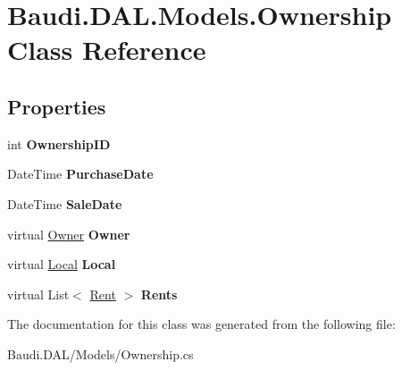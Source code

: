 \hypertarget{class_baudi_1_1_d_a_l_1_1_models_1_1_ownership}{}\section{Baudi.\+D\+A\+L.\+Models.\+Ownership Class Reference}
\label{class_baudi_1_1_d_a_l_1_1_models_1_1_ownership}
\subsection*{Properties}
\begin{DoxyCompactItemize}
\item 
\hypertarget{class_baudi_1_1_d_a_l_1_1_models_1_1_ownership_a67588bd63f0962b2f5cf62d6778af4b2}{}int {\bfseries Ownership\+I\+D}\label{class_baudi_1_1_d_a_l_1_1_models_1_1_ownership_a67588bd63f0962b2f5cf62d6778af4b2}

\item 
\hypertarget{class_baudi_1_1_d_a_l_1_1_models_1_1_ownership_abc943dc262607f0913859eef37ecb607}{}Date\+Time {\bfseries Purchase\+Date}\label{class_baudi_1_1_d_a_l_1_1_models_1_1_ownership_abc943dc262607f0913859eef37ecb607}

\item 
\hypertarget{class_baudi_1_1_d_a_l_1_1_models_1_1_ownership_aa1959d9d10b0accbbd3972854c8a0af5}{}Date\+Time {\bfseries Sale\+Date}\label{class_baudi_1_1_d_a_l_1_1_models_1_1_ownership_aa1959d9d10b0accbbd3972854c8a0af5}

\item 
\hypertarget{class_baudi_1_1_d_a_l_1_1_models_1_1_ownership_a6d30055ea92b03795b75364697a832e9}{}virtual \hyperlink{class_baudi_1_1_d_a_l_1_1_models_1_1_owner}{Owner} {\bfseries Owner}\label{class_baudi_1_1_d_a_l_1_1_models_1_1_ownership_a6d30055ea92b03795b75364697a832e9}

\item 
\hypertarget{class_baudi_1_1_d_a_l_1_1_models_1_1_ownership_a1c18e57fd0fec27084495006e2eb7e2e}{}virtual \hyperlink{class_baudi_1_1_d_a_l_1_1_models_1_1_local}{Local} {\bfseries Local}\label{class_baudi_1_1_d_a_l_1_1_models_1_1_ownership_a1c18e57fd0fec27084495006e2eb7e2e}

\item 
\hypertarget{class_baudi_1_1_d_a_l_1_1_models_1_1_ownership_ac3b4c10ba07ddb6c75355ad64cf60979}{}virtual List$<$ \hyperlink{class_baudi_1_1_d_a_l_1_1_models_1_1_rent}{Rent} $>$ {\bfseries Rents}\label{class_baudi_1_1_d_a_l_1_1_models_1_1_ownership_ac3b4c10ba07ddb6c75355ad64cf60979}

\end{DoxyCompactItemize}


The documentation for this class was generated from the following file\+:\begin{DoxyCompactItemize}
\item 
Baudi.\+D\+A\+L/\+Models/Ownership.\+cs\end{DoxyCompactItemize}
